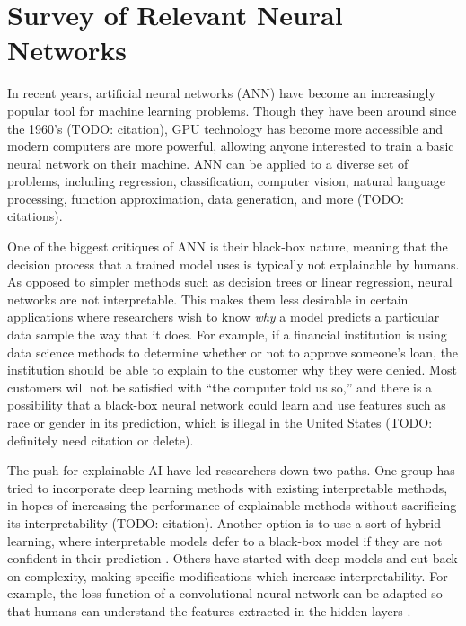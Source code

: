 \chapter{Survey of Relevant Neural Networks}

In recent years, artificial neural networks (ANN) have become an increasingly popular tool for machine learning problems. Though they have been around since the 1960's (TODO: citation), GPU technology has become more accessible and modern computers are more powerful, allowing anyone interested to train a basic neural network on their machine. ANN can be applied to a diverse set of problems, including regression, classification, computer vision, natural language processing, function approximation, data generation, and more (TODO: citations).

One of the biggest critiques of ANN is their black-box nature, meaning that the decision process that a trained model uses is typically not explainable by humans. As opposed to simpler methods such as decision trees or linear regression, neural networks are not interpretable. This makes them less desirable in certain applications where researchers wish to know \textit{why} a model predicts a particular data sample the way that it does. For example, if a financial institution is using data science methods to determine whether or not to approve someone's loan, the institution should be able to explain to the customer why they were denied. Most customers will not be satisfied with ``the computer told us so,'' and there is a possibility that a black-box neural network could learn and use features such as race or gender in its prediction, which is illegal in the United States (TODO: definitely need citation or delete).

The push for explainable AI have led researchers down two paths. One group has tried to incorporate deep learning methods with existing interpretable methods, in hopes of increasing the performance of explainable methods without sacrificing its interpretability (TODO: citation). Another option is to use a sort of hybrid learning, where interpretable models defer to a black-box model if they are not confident in their prediction \cite{rafique2020}. Others have started with deep models and cut back on complexity, making specific modifications which increase interpretability. For example, the loss function of a convolutional neural network can be adapted so that humans can understand the features extracted in the hidden layers \cite{zhang2018interpretable}. 

